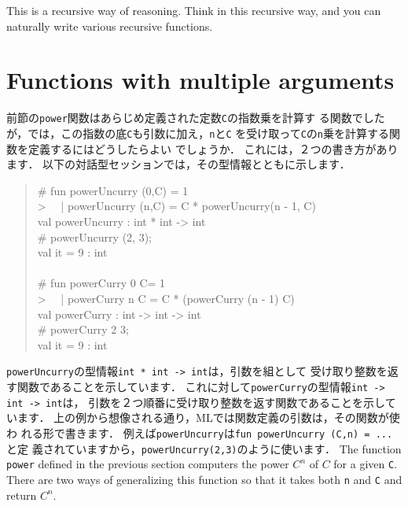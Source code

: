 \documentclass{jbook}
\newif\ifjp
\newcommand{\txt}[2]{#2}
\begin{document}
	This is a recursive way of reasoning.
	Think in this recursive way, and you can naturally write various
recursive functions.
\fi%

\section{\txt{複数の引数を取る関数}{Functions with multiple arguments}}
\label{sec:tutorialMultiargfun}

\ifjp%
	前節の{\tt power}関数はあらじめ定義された定数{\tt C}の指数乗を計算す
る関数でしたが，では，この指数の底{\tt C}も引数に加え，{\tt n}と{\tt C}
を受け取って{\tt C}の{\tt n}乗を計算する関数を定義するにはどうしたらよい
でしょうか．
	これには，２つの書き方があります．
	以下の対話型セッションでは，その型情報とともに示します．
\begin{tt}
\begin{quote}
\# fun powerUncurry (0,C) = 1\\
> \ \ | powerUncurry (n,C) = C * powerUncurry(n - 1, C)\\
val powerUncurry : int * int -> int\\
\# powerUncurry (2, 3);\\
val it = 9 : int\\
\ \\
\# fun powerCurry 0 C= 1\\
> \ \ | powerCurry n C = C * (powerCurry (n - 1) C)\\
val powerCurry : int -> int -> int\\
\# powerCurry 2 3;\\
val it = 9 : int
\end{quote}
\end{tt}
	{\tt powerUncurry}の型情報{\tt int * int -> int}は，引数を組として
受け取り整数を返す関数であることを示しています．
	これに対して{\tt powerCurry}の型情報{\tt int -> int -> int}は，
引数を２つ順番に受け取り整数を返す関数であることを示しています．
	上の例から想像される通り，MLでは関数定義の引数は，その関数が使わ
れる形で書きます．
	例えば{\tt powerUncurry}は{\tt fun powerUncurry (C,n) = ...}と定
義されていますから，{\tt powerUncurry(2,3)}のように使います．
\else%
	The function {\tt power} defined in the previous section
computers the power $C^n$ of $C$ for a given {\tt C}.
	There are two ways of generalizing this function so that it takes 
both {\tt n} and {\tt C} and return $C^n$.
\end{document}
